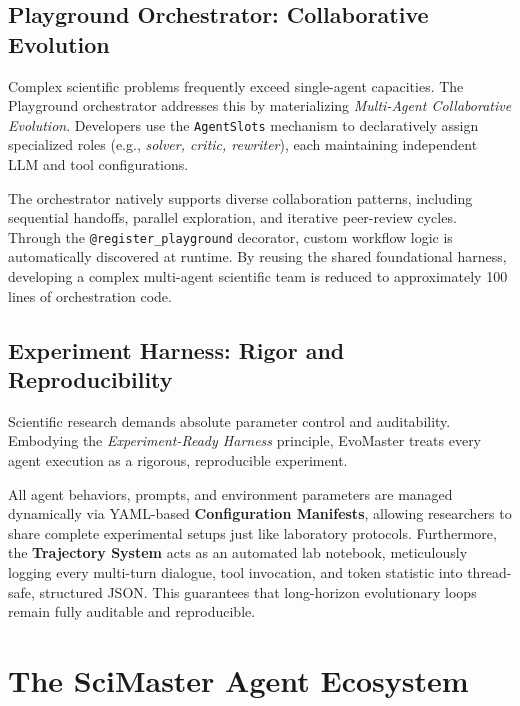 \documentclass[11pt, a4paper, logo, copyright, nonumbering]{cls/Sci}
\begin{document}
\subsection{Playground Orchestrator: Collaborative Evolution}

Complex scientific problems frequently exceed single-agent capacities. The Playground orchestrator addresses this by materializing \emph{Multi-Agent Collaborative Evolution}. Developers use the \texttt{AgentSlots} mechanism to declaratively assign specialized roles (e.g., \textit{solver, critic, rewriter}), each maintaining independent LLM and tool configurations. 

The orchestrator natively supports diverse collaboration patterns, including sequential handoffs, parallel exploration, and iterative peer-review cycles. Through the \texttt{@register\_playground} decorator, custom workflow logic is automatically discovered at runtime. By reusing the shared foundational harness, developing a complex multi-agent scientific team is reduced to approximately 100 lines of orchestration code.

\subsection{Experiment Harness: Rigor and Reproducibility}

Scientific research demands absolute parameter control and auditability. Embodying the \emph{Experiment-Ready Harness} principle, EvoMaster treats every agent execution as a rigorous, reproducible experiment. 

All agent behaviors, prompts, and environment parameters are managed dynamically via YAML-based \textbf{Configuration Manifests}, allowing researchers to share complete experimental setups just like laboratory protocols. Furthermore, the \textbf{Trajectory System} acts as an automated lab notebook, meticulously logging every multi-turn dialogue, tool invocation, and token statistic into thread-safe, structured JSON. This guarantees that long-horizon evolutionary loops remain fully auditable and reproducible.

\section{The SciMaster Agent Ecosystem}
\label{sec:scimaster}
\end{document}

